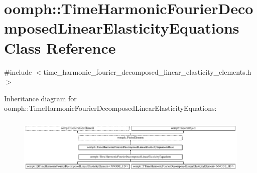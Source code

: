 \hypertarget{classoomph_1_1TimeHarmonicFourierDecomposedLinearElasticityEquations}{}\section{oomph\+:\+:Time\+Harmonic\+Fourier\+Decomposed\+Linear\+Elasticity\+Equations Class Reference}
\label{classoomph_1_1TimeHarmonicFourierDecomposedLinearElasticityEquations}


{\ttfamily \#include $<$time\+\_\+harmonic\+\_\+fourier\+\_\+decomposed\+\_\+linear\+\_\+elasticity\+\_\+elements.\+h$>$}

Inheritance diagram for oomph\+:\+:Time\+Harmonic\+Fourier\+Decomposed\+Linear\+Elasticity\+Equations\+:\begin{figure}[H]
\begin{center}
\leavevmode
\includegraphics[height=2.857143cm]{classoomph_1_1TimeHarmonicFourierDecomposedLinearElasticityEquations}
\end{center}
\end{figure}
